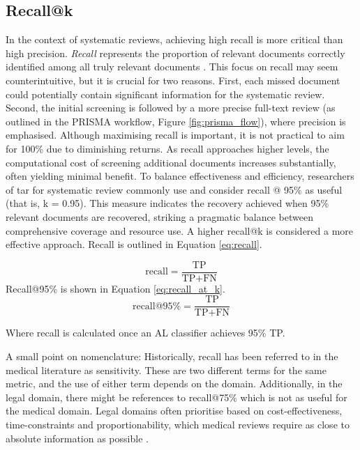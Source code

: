 \documentclass[10pt,oneside]{book}
\begin{document}
\subsection{Recall@k}
In the context of systematic reviews, achieving high recall is more critical than high precision. \emph{Recall} represents the proportion of relevant documents correctly identified among all truly relevant documents \cite{omara-eves_using_2015}. This focus on recall may seem counterintuitive, but it is crucial for two reasons. First, each missed document could potentially contain significant information for the systematic review. Second, the initial screening is followed by a more precise full-text review (as outlined in the PRISMA workflow, Figure \ref{fig:prisma_flow}), where precision is emphasised.
Although maximising recall is important, it is not practical to aim for 100\% due to diminishing returns. As recall approaches higher levels, the computational cost of screening additional documents increases substantially, often yielding minimal benefit. To balance effectiveness and efficiency, researchers of \gls*{tar} for systematic review commonly use and consider recall @ 95\% as useful (that is, k = 0.95). This measure indicates the recovery achieved when 95\% relevant documents are recovered, striking a pragmatic balance between comprehensive coverage and resource use. A higher recall@k is considered a more effective approach.
Recall is outlined in Equation \ref{eq:recall}.

\begin{equation}
\text{recall} = \frac{\text{TP}}{\text{TP} + \text{FN}}
\label{eq:recall}
\end{equation}
Recall@95\% is shown in Equation \ref{eq:recall_at_k}.
\begin{equation}
\text{recall@95\%} = \frac{\text{TP}}{\text{TP} + \text{FN}}
\label{eq:recall_at_k}
\end{equation}

Where recall is calculated once an AL classifier achieves 95\% TP.

A small point on nomenclature: Historically, recall has been referred to in the medical literature as sensitivity. These are two different terms for the same metric, and the use of either term depends on the domain. Additionally, in the legal domain, there might be references to recall@75\% which is not as useful for the medical domain. Legal domains often prioritise based on cost-effectiveness, time-constraints and proportionability, which medical reviews require as close to absolute information as possible \cite{tsafnat_systematic_2014}.
\end{document}
